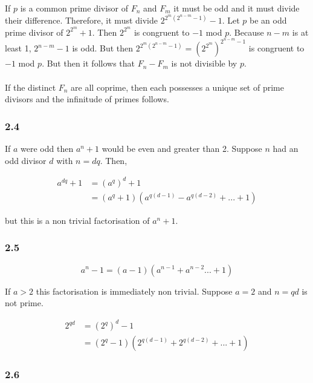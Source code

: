 If $p$ is a common prime divisor of $F_n$ and $F_m$ 
it must be odd and it must divide their difference. 
Therefore, it must divide $2^{2^m(2^{n-m} - 1)} - 1$. 
Let $p$ be an odd prime divisor of $2^{2^m} + 1$. Then 
$2^{2^m}$ is congruent to $-1$ mod $p$. Because $n-m$ 
is at least 1, $2^{n-m} - 1$ is odd. But then 
$2^{2^m(2^{n-m} - 1)} = \left(2^{2^m}\right)^{2^{n-m}-1}$ 
is congruent to $-1$ mod $p$. But then it follows that 
$F_n - F_m$ is not divisible by $p$. \\ \\

If the distinct $F_n$ are all coprime, then each possesses 
a unique set of prime divisors and the infinitude of primes 
follows.

\subsubsection{2.4}

If $a$ were odd then $a^n + 1$ would be even and greater than 
2. Suppose $n$ had an odd divisor $d$ with $n = dq$. Then,

\begin{align*}
    a^{dq} + 1 &= \left(a^{q}\right)^d + 1 \\
    &= (a^q + 1)(a^{q(d-1)} - a^{q(d-2)} + ... + 1)
\end{align*}

but this is a non trivial factorisation of $a^n + 1$.

\subsubsection{2.5}

\begin{equation*}
    a^n - 1 = (a-1)(a^{n-1} + a^{n-2} ... + 1)
\end{equation*}

If $a > 2$ this factorisation is immediately non trivial. 
Suppose $a=2$ and $n = qd$ is not prime.

\begin{align*}
    2^{qd} &= \left(2^q\right)^d - 1 \\
    &= (2^{q} - 1)(2^{q(d-1)} + 2^{q(d-2)} + ... + 1)
\end{align*}

\subsubsection{2.6}


